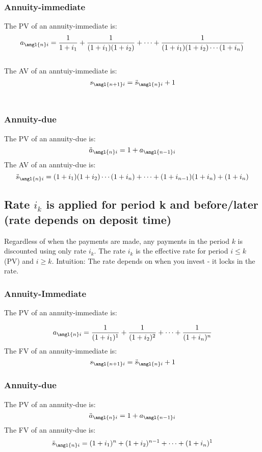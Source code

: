 \subsubsection{Annuity-immediate}
\begin{comments}

    The PV of an annuity-immediate is: 
    \[ a_{\angl{n}i} = \frac{1}{1 + i_1} + \frac{1}{(1 + i_1)(1 + i_2)} + \cdots + \frac{1}{(1 + i_1)(1 + i_2) \cdots (1 + i_n)} \] \\
    The AV of an anntuiy-immediate is:
    \[ s_{\angl{n+1}i} = \ddot{s}_{\angl{n}i} + 1 \] \\
\end{comments}


\subsubsection{Annuity-due}
\begin{comments}
    The PV of an annuity-due is:
    \[ \ddot{a}_{\angl{n}i} = 1 + a_{\angl{n-1}i} \] 
    The AV of an anntuiy-due is: 
    \[ \ddot{s}_{\angl{n}i} = (1 + i_1)(1 + i_2)\cdots(1 + i_n) + \cdots + (1 + i_{n-1})(1 + i_n) + (1 + i_n) \]
\end{comments}


\subsection{Rate $i_k$ is applied for period k and before/later (rate depends on deposit time)}

\begin{comments}
    Regardless of when the payments are made, any payments in the period $k$ is discounted using only rate $i_k$. 
    The rate $i_k$ is the effective rate for period $i\leq k$ (PV) and $i\ge k$.  Intuition: The rate depends on 
    when you invest - it locks in the rate. 
\end{comments}


\subsubsection{Annuity-Immediate}
The PV of an annuity-immediate is:  

\[ a_{\angl{n}i} = \frac{1}{(1 + i_1)^1} + \frac{1}{(1 + i_2)^2} + \cdots + \frac{1}{(1 + i_n)^n}\]
The FV of an annuity-immediate is:  
\[s_{\angl{n+1}i} = \ddot{s}_{\angl{n}i} + 1 \]

\subsubsection{Annuity-due}
The PV of an annuity-due is:
\[\ddot{a}_{\angl{n}i} = 1 + a_{\angl{n-1}i}\]
The FV of an annuity-due is:
\[\ddot{s}_{\angl{n}i} = (1 + i_1)^n + (1 + i_2)^{n-1} + \cdots + (1 + i_n)^1\]




